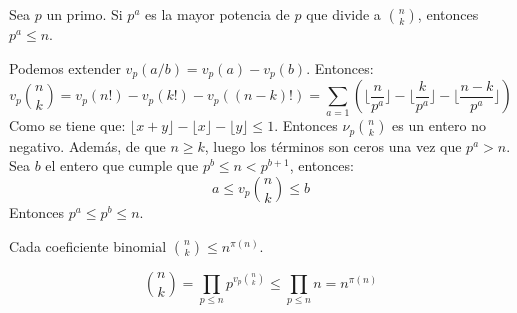 \documentclass[TAN.tex]{subfiles}
\begin{document}
\begin{lemma}
Sea $p$ un primo. Si $p^a$ es la mayor potencia de $p$ que divide a $\binom{n}{k}$, entonces $p^a ≤ n$.
\end{lemma}
\begin{dem}
Podemos extender $v_p(a/b) = v_p(a)-v_p(b)$. Entonces:
\[ v_p\binom{n}{k} = v_p(n!) - v_p(k!) - v_p((n-k)!) = \sum_{a=1} \left(\lfloor \frac{n}{p^a} \rfloor - \lfloor \frac{k}{p^a}\rfloor - \lfloor \frac{n-k}{p^a} \rfloor\right) \]
Como se tiene que: $\lfloor x+y \rfloor -\lfloor x\rfloor - \lfloor y \rfloor ≤ 1$. Entonces $ν_p\binom{n}{k}$ es un entero no negativo. Además, de que $n ≥ k$, luego los términos son ceros una vez que $p^a>n$. Sea $b$ el entero que cumple que $p^b ≤ n < p^{b+1}$, entonces:
\[ a ≤ v_p\binom{n}{k} ≤ b \]
Entonces $p^a≤p^b≤n$.
\end{dem}

\begin{coro}
Cada coeficiente binomial $\binom{n}{k} ≤ n^{π(n)}$.
\end{coro}
\begin{dem}
\[ \binom{n}{k} = \prod_{p≤n} p^{v_p\binom{n}{k}} ≤ \prod_{p≤n} n = n^{π(n)} \]
\end{dem}
\end{document}
